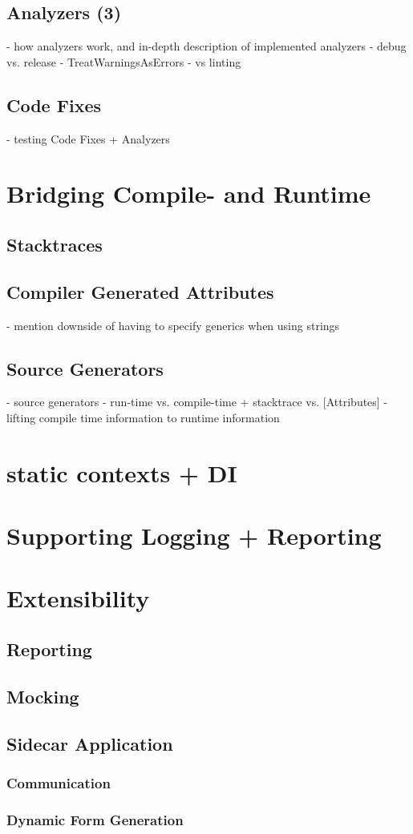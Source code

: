 \subsection{Analyzers (3)}
- how analyzers work, and in-depth description of implemented analyzers
- debug vs. release
- TreatWarningsAsErrors
- vs linting
\subsection{Code Fixes}
- testing Code Fixes + Analyzers
\section{Bridging Compile- and Runtime}
\subsection{Stacktraces}
\subsection{Compiler Generated Attributes}
- mention downside of having to specify generics when using strings
\subsection{Source Generators}
- source generators
- run-time vs. compile-time + stacktrace vs. [Attributes]
- lifting compile time information to runtime information
\section{static contexts + DI}
\section{Supporting Logging + Reporting}
\section{Extensibility}
\subsection{Reporting}
\subsection{Mocking}
\subsection{Sidecar Application}
\subsubsection{Communication}
\subsubsection{Dynamic Form Generation}
